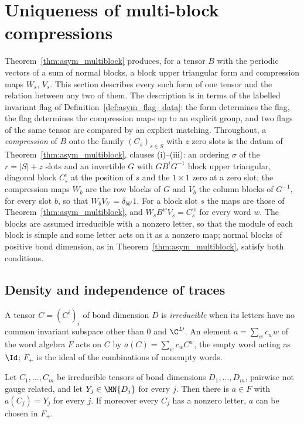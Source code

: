 \section{Uniqueness of multi-block compressions}%
\label{sec:asym_uniqueness}

Theorem~\ref{thm:asym_multiblock} produces, for a tensor $B$ with the periodic vectors of a sum of
normal blocks, a block upper triangular form and compression maps $W_s$, $V_s$. This section
describes every such form of one tensor and the relation between any two of them. The description
is in terms of the labelled invariant flag of Definition~\ref{def:asym_flag_data}: the form
determines the flag, the flag determines the compression maps up to an explicit group, and two
flags of the same tensor are compared by an explicit matching. Throughout, a \emph{compression} of
$B$ onto the family $(C_s)_{s\in S}$ with $z$ zero slots is the datum of
Theorem~\ref{thm:asym_multiblock}, clauses (i)--(iii): an ordering $\sigma$ of the $r=|S|+z$ slots
and an invertible $G$ with $GB^iG^{-1}$ block upper triangular, diagonal block $C_s^i$ at the
position of $s$ and the $1\times1$ zero at a zero slot; the compression maps $W_b$ are the row
blocks of $G$ and $V_b$ the column blocks of $G^{-1}$, for every slot $b$, so that
$W_bV_{b'}=\delta_{bb'}1$. For a block slot $s$ the maps are those of
Theorem~\ref{thm:asym_multiblock}, and $W_sB^wV_s=C_s^w$ for every word $w$. The blocks are
assumed irreducible with a nonzero letter, so that the module of each block is simple and some
letter acts on it as a nonzero map; normal blocks of positive bond dimension, as in
Theorem~\ref{thm:asym_multiblock}, satisfy both conditions.

\subsection{Density and independence of traces}

A tensor $C=(C^i)_i$ of bond dimension $D$ is \emph{irreducible} when its letters have no common
invariant subspace other than $0$ and $\C^D$. An element $a=\sum_wc_ww$ of the word algebra $F$
acts on $C$ by $a(C)=\sum_wc_wC^w$, the empty word acting as $\Id$; $F_+$ is the ideal of the
combinations of nonempty words.

\begin{lemma}
    \label{thm:asym_uniq_density}
    \leanok
    Let $C_1,\ldots,C_m$ be irreducible tensors of bond dimensions $D_1,\ldots,D_m$, pairwise not
    gauge related, and let $Y_j\in\MN{D_j}$ for every $j$. Then there is $a\in F$ with $a(C_j)=Y_j$
    for every $j$. If moreover every $C_j$ has a nonzero letter, $a$ can be chosen in $F_+$.
\end{lemma}

